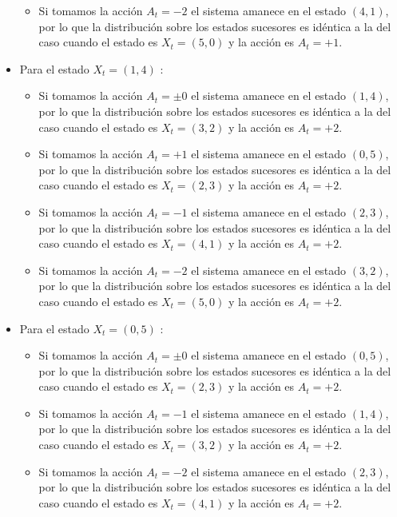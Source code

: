 \documentclass[ a4paper, twoside, 11pt]{article}
\begin{document}
\begin{problem}
\begin{itemize}
\begin{itemize}
\item Si tomamos la acci\'on $A_t = -2$ el sistema amanece en el estado $(4,1)$, por lo que la distribuci\'on sobre los estados sucesores es id\'entica a la del caso cuando el estado es $X_t = (5,0)$ y la acci\'on es $A_t = +1$. 
\end{itemize}
\item Para el estado $X_t = (1,4)$ :
\begin{itemize}
\item Si tomamos la acci\'on $A_t = \pm 0$ el sistema amanece en el estado $(1,4)$, por lo que la distribuci\'on sobre los estados sucesores es id\'entica a la del caso cuando el estado es $X_t = (3,2)$ y la acci\'on es $A_t = +2$. 
\item Si tomamos la acci\'on $A_t = +1$ el sistema amanece en el estado $(0,5)$, por lo que la distribuci\'on sobre los estados sucesores es id\'entica a la del caso cuando el estado es $X_t = (2,3)$ y la acci\'on es $A_t = +2$. 
\item Si tomamos la acci\'on $A_t = -1$ el sistema amanece en el estado $(2,3)$, por lo que la distribuci\'on sobre los estados sucesores es id\'entica a la del caso cuando el estado es $X_t = (4,1)$ y la acci\'on es $A_t = +2$. 
\item Si tomamos la acci\'on $A_t = -2$ el sistema amanece en el estado $(3,2)$, por lo que la distribuci\'on sobre los estados sucesores es id\'entica a la del caso cuando el estado es $X_t = (5,0)$ y la acci\'on es $A_t = +2$. 
\end{itemize}
\item Para el estado $X_t = (0,5)$ :
\begin{itemize}
\item Si tomamos la acci\'on $A_t = \pm 0$ el sistema amanece en el estado $(0,5)$, por lo que la distribuci\'on sobre los estados sucesores es id\'entica a la del caso cuando el estado es $X_t = (2,3)$ y la acci\'on es $A_t = +2$. 
\item Si tomamos la acci\'on $A_t = -1$ el sistema amanece en el estado $(1,4)$, por lo que la distribuci\'on sobre los estados sucesores es id\'entica a la del caso cuando el estado es $X_t = (3,2)$ y la acci\'on es $A_t = +2$. 
\item Si tomamos la acci\'on $A_t = -2$ el sistema amanece en el estado $(2,3)$, por lo que la distribuci\'on sobre los estados sucesores es id\'entica a la del caso cuando el estado es $X_t = (4,1)$ y la acci\'on es $A_t = +2$. 
\end{itemize}
\end{itemize}


\end{problem}
\end{document}
